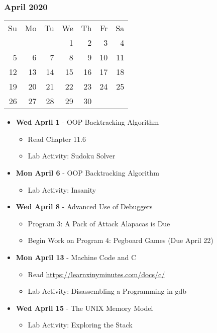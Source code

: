 \subsubsection*{April 2020}
\begin{tabular}{rrrrrrr}
Su & Mo & Tu & We & Th & Fr & Sa\\
   &    &    &  1 &  2 &  3 &  4\\
 5 &  6 &  7 &  8 &  9 & 10 & 11\\
12 & 13 & 14 & 15 & 16 & 17 & 18\\
19 & 20 & 21 & 22 & 23 & 24 & 25\\ \cline{3-3}
26 & 27 & \multicolumn{1}{|r|}{28} & 29 & 30 &    &\\ \cline{3-3}
\end{tabular}
\begin{itemize}
\item\textbf{Wed April  1} - OOP Backtracking Algorithm
    \begin{itemize}
        \item Read Chapter 11.6 
        \item Lab Activity: Sudoku Solver
    \end{itemize}
\item\textbf{Mon April  6} - OOP Backtracking Algorithm
    \begin{itemize}
        \item Lab Activity: Insanity
    \end{itemize}
\item\textbf{Wed April  8} - Advanced Use of Debuggers
    \begin{itemize}
        \item Program 3: A Pack of Attack Alapacas is Due
        \item Begin Work on Program 4: Pegboard Games (Due April 22)
    \end{itemize}
\item\textbf{Mon April 13} - Machine Code and C
    \begin{itemize}
        \item Read \url{https://learnxinyminutes.com/docs/c/}
        \item Lab Activity: Disassembling a Programming in gdb
    \end{itemize}
\item\textbf{Wed April 15} - The UNIX Memory Model
    \begin{itemize}
        \item Lab Activity: Exploring the Stack
    \end{itemize}

\end{itemize}
